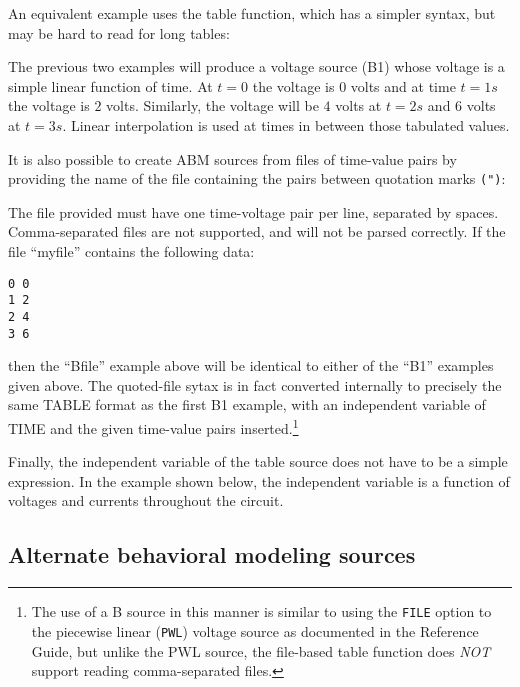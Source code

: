 
An equivalent example uses the table function, which has a simpler syntax, but
 may be hard to read for long tables:


The previous two examples will produce a voltage source (B1) whose voltage
is a simple linear function of time.  At $t=0$ the voltage is $0$ volts and 
at time $t=1s$ the voltage is $2$ volts.  Similarly, the voltage will
be $4$ volts at $t=2s$ and $6$ volts at $t=3s$. Linear interpolation is
used at times in between those tabulated values.

It is also possible to create ABM sources from files of time-value pairs by providing the name of the file containing the pairs between quotation marks \texttt{(")}:


The file provided must have one time-voltage pair per line, separated
by spaces.  Comma-separated files are not supported, and will not be
parsed correctly.  If the file ``myfile'' contains the following data:
\begin{verbatim}
0 0
1 2
2 4
3 6
\end{verbatim}
then the ``Bfile'' example above will be identical to either of the
``B1'' examples given above.  The quoted-file sytax is in fact converted
internally to precisely the same TABLE format as the first B1 example,
with an independent variable of TIME and the given time-value pairs
inserted.\footnote{The use of a B source in this manner is similar to using the \texttt{FILE} option to the piecewise linear (\texttt{PWL}) voltage source as documented in the \Xyce{} Reference Guide\ReferenceGuide, but unlike the PWL source, the file-based table function does {\em NOT\/} support reading comma-separated files.}

Finally, the independent variable of the table source does not have to be a
simple expression.  In the example shown below, the independent variable is
a function of voltages and currents throughout the circuit.


\subsection{Alternate behavioral modeling sources}

